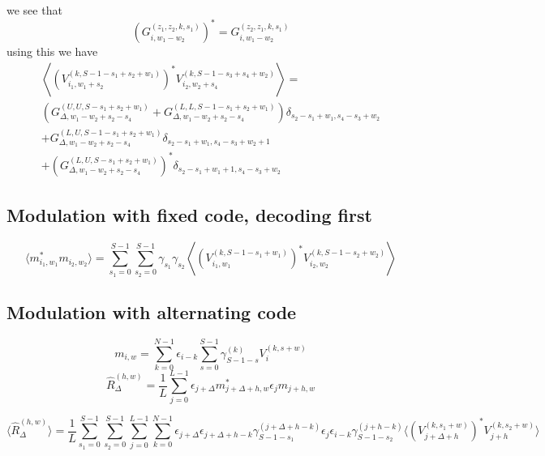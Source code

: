 \documentclass[18pt,a4paper]{extarticle}
\begin{document}
we see that
\begin{equation}
\left( G^{(z_1, z_2, k, s_1)}_{i, w_1 - w_2} \right)^* = G^{(z_2, z_1, k, s_1)}_{i, w_1 - w_2}
\end{equation}
using this we have
\begin{align}
\left \langle \left(V_{i_1,w_1+s_2}^{(k, S - 1 - s_1 + s_2 + w_1)} \right)^* V_{i_2,w_2+s_4}^{(k, S - 1 - s_3 + s_4 + w_2)} \right\rangle =\\
\left( G^{(U, U, S-s_1+s_2+w_1)}_{\Delta, w_1 - w_2 + s_2 - s_4} + G^{(L, L, S-1-s_1+s_2+w_1)}_{\Delta, w_1 - w_2 + s_2 - s_4} \right) \delta_{s_2 - s_1 + w_1, s_4 - s_3 + w_2}\\
+G^{(L, U, S-1-s_1+s_2+w_1)}_{\Delta, w_1 - w_2 + s_2 - s_4} \delta_{s_2 - s_1 + w_1, s_4 - s_3 + w_2 + 1}\\
+\left( G^{(L, U, S-s_1+s_2+w_1)}_{\Delta, w_1 - w_2 + s_2 - s_4} \right)^* \delta_{s_2 - s_1 + w_1 + 1, s_4 - s_3 + w_2}
\end{align}
\subsection{Modulation with fixed code, decoding first}
\begin{equation}
\langle m_{i_1, w_1}^* m_{i_2, w_2}\rangle = \sum_{s_1=0}^{S-1}\sum_{s_2=0}^{S-1} \gamma_{s_1} \gamma_{s_2} \left\langle \left( V^{(k, S-1-s_1 + w_1)}_{i_1, w_1} \right)^* V^{(k, S-1-s_2 + w_2)}_{i_2, w_2} \right \rangle
\end{equation}

\subsection{Modulation with alternating code}
\begin{equation}
m_{i,w} = \sum_{k=0}^{N-1} \epsilon_{i-k} \sum_{s=0}^{S-1} \gamma^{(k)}_{S-1-s} V^{(k, s + w)}_{i}
\end{equation}
\begin{equation}
\hat{R}^{(h, w)}_\Delta = \frac{1}{L}\sum^{L-1}_{j=0}
\epsilon_{j + \Delta}m_{j + \Delta + h, w}^*
\epsilon_jm_{j + h, w}
\end{equation}

\begin{equation}
\langle \hat{R}^{(h, w)}_\Delta \rangle = \frac{1}{L}
\sum_{s_1=0}^{S-1}
\sum_{s_2=0}^{S-1}
\sum^{L-1}_{j=0}
\sum_{k=0}^{N-1}
\epsilon_{j + \Delta}
\epsilon_{j + \Delta + h - k}\gamma^{(j + \Delta + h - k)}_{S-1-s_1}
\epsilon_j
\epsilon_{i - k} \gamma^{(j + h - k)}_{S-1-s_2}
\langle \left(V^{(k, s_1 + w)}_{j + \Delta + h}\right)^* V^{(k, s_2 + w)}_{j+h} \rangle
\end{equation}
\end{document}
